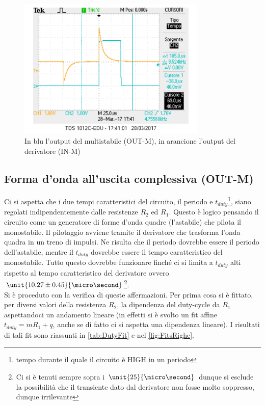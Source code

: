 \documentclass[a4paper,10pt]{article}
\begin{document}
\begin{figure}[H]
	\centering
	\includegraphics[width=0.8\textwidth]{../grafici/4InMOutM.png}
	\caption{In blu l'output del multistabile (OUT-M), in arancione l'output del derivatore (IN-M)}
	\label{fig:InMOutM}
\end{figure}

\pagebreak[1]
\subsection{Forma d'onda all'uscita complessiva (OUT-M)}

Ci si aspetta che i due tempi caratteristici del circuito, il periodo e $t_{duty}$\footnote{tempo durante il quale il circuito è HIGH in un periodo}, siano regolati indipendentemente dalle resistenze $R_2$ ed $R_1$. Questo è logico pensando il circuito come un generatore di forme d'onda quadre (l'astabile) che pilota il monostabile. Il pilotaggio avviene tramite il derivatore che trasforma l'onda quadra in un treno di impulsi. Ne risulta che il periodo dovrebbe essere il periodo dell'astabile, mentre il $t_{duty}$ dovrebbe essere il tempo caratteristico del monostabile. Tutto questo dovrebbe funzionare finché ci si limita a $t_{duty}$ alti rispetto al tempo caratteristico del derivatore ovvero $\unit{10.27 \pm 0.45}{\micro\second}$\footnote{Ci si è tenuti sempre sopra i $\unit{25}{\micro\second}$ dunque si esclude la possibilità che il transiente dato dal derivatore non fosse molto soppresso, dunque irrilevante}.\\
Si è proceduto con la verifica di queste affermazioni. Per prima cosa si è fittato, per diversi valori della resistenza $R_2$, la dipendenza del duty-cycle da $R_1$ aspettandoci un andamento lineare (in effetti si è svolto un fit affine $t_{duty}=mR_1+q$, anche se di fatto ci si aspetta una dipendenza lineare). I risultati di tali fit sono riassunti in \cref{tab:DutyFit} e nel \cref{fig:FitsRighe}. 
\end{document}
